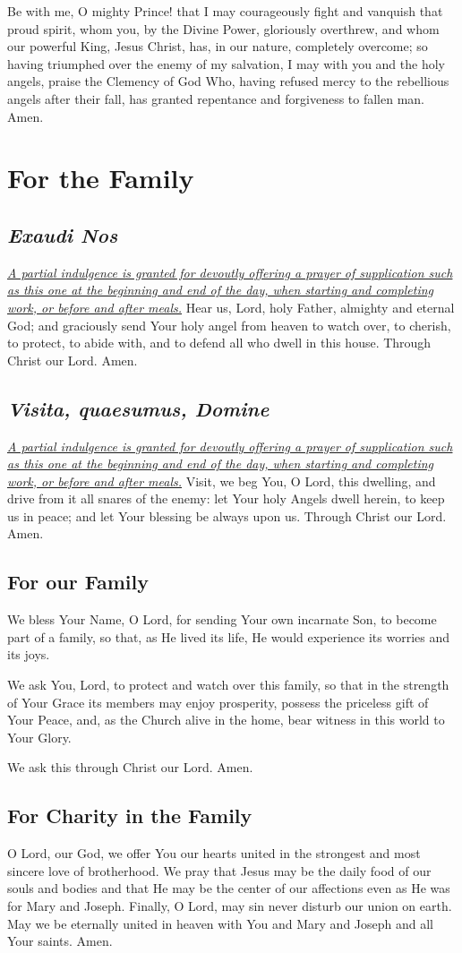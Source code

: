 \documentclass[12pt]{article}
\newcommand{\prayersection}[1]{\section{#1}}
\newcommand{\prayertitle}[1]{\subsection{#1}}
\newcommand{\indulgencedprayertitle}[1]{\prayertitle{#1 \protect\kreuz}}
\newcommand{\emphasis}[1]{\emph{#1}}
\newcommand{\emphasis}[1]{\textsl{#1}}
\newcommand{\foreign}[1]{\emphasis{#1}}
\newcommand{\note}[1]{{\small{\emphasis{#1}}}\newline}
\newcommand{\linkednote}[2]{\hyperlink{#1}{\note{#2}}}
\begin{document}
Be with me, O mighty Prince!
that I may courageously fight and vanquish that proud spirit, whom you, by the Divine Power, gloriously overthrew, and whom our powerful King, Jesus Christ, has, in our nature, completely overcome;
so having triumphed over the enemy of my salvation, I may with you and the holy angels, praise the Clemency of God Who, having refused mercy to the rebellious angels after their fall, has granted repentance and forgiveness to fallen man. Amen.

\newpage

\prayersection{For the Family}
\indulgencedprayertitle{\foreign{Exaudi Nos}}
\linkednote{grant26}{A partial indulgence is granted for devoutly offering a prayer of supplication such as this one at the beginning and end of the day, when starting and completing work, or before and after meals.}
Hear us, Lord, holy Father, almighty and eternal God;
and graciously send Your holy angel from heaven to watch over, to cherish, to protect, to abide with, and to defend all who dwell in this house.
Through Christ our Lord. Amen.

\indulgencedprayertitle{\foreign{Visita, quaesumus, Domine}}
\linkednote{grant26}{A partial indulgence is granted for devoutly offering a prayer of supplication such as this one at the beginning and end of the day, when starting and completing work, or before and after meals.}
Visit, we beg You, O Lord, this dwelling, and drive from it all snares of the enemy:
let Your holy Angels dwell herein, to keep us in peace;
and let Your blessing be always upon us.
Through Christ our Lord.
Amen.

\prayertitle{For our Family}
We bless Your Name, O Lord, for sending Your own incarnate Son, to become part of a family, so that, as He lived its life, He would experience its worries and its joys.

We ask You, Lord, to protect and watch over this family, so that in the strength of Your Grace its members may enjoy prosperity, possess the priceless gift of Your Peace, and, as the Church alive in the home, bear witness in this world to Your Glory.

We ask this through Christ our Lord.
Amen.
\newpage
\prayertitle{For Charity in the Family}
O Lord, our God, we offer You our hearts united in the strongest and most sincere love of brotherhood.
We pray that Jesus may be the daily food of our souls and bodies and that He may be the center of our affections even as He was for Mary and Joseph.
Finally, O Lord, may sin never disturb our union on earth.
May we be eternally united in heaven with You and Mary and Joseph and all Your saints.
Amen.
\end{document}
